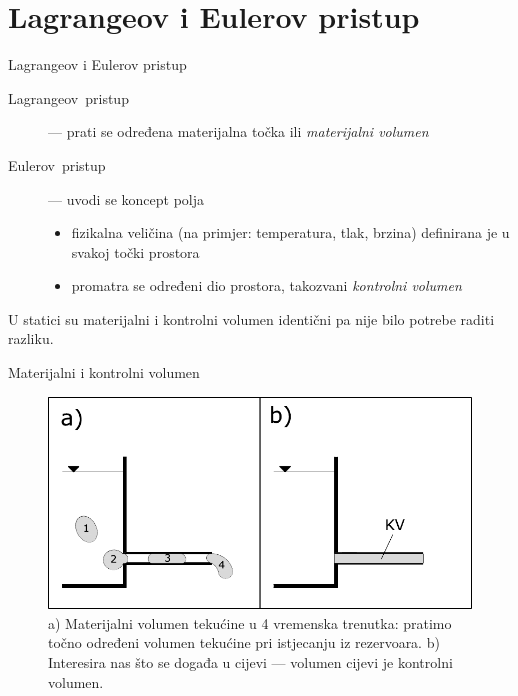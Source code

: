 \documentclass[croatian]{beamer}
\begin{document}
\naslovnislajd

\section{Lagrangeov i Eulerov pristup}

\begin{frame}{Lagrangeov i Eulerov pristup}

\begin{description}
\item [{Lagrangeov~pristup}] --- prati se određena materijalna točka
ili \emph{materijalni volumen}
\item [{Eulerov~pristup}] --- uvodi se koncept polja

\begin{itemize}
\item fizikalna veličina (na primjer: temperatura, tlak, brzina) definirana
je u svakoj točki prostora
\item promatra se određeni dio prostora, takozvani \emph{kontrolni volumen}
\end{itemize}

\end{description}
U statici su materijalni i kontrolni volumen identični pa nije bilo
potrebe raditi razliku.
\end{frame}

\begin{frame}{Materijalni i kontrolni volumen}

\begin{figure}
\begin{centering}
\includegraphics[width=0.8\paperwidth]{slike/slika-mat-vs-kont}
\par\end{centering}
\caption{a) Materijalni volumen tekućine u 4 vremenska trenutka: pratimo točno
određeni volumen tekućine pri istjecanju iz rezervoara. b) Interesira
nas što se događa u cijevi --- volumen cijevi je kontrolni volumen.}
\end{figure}
\end{frame}
\end{document}
